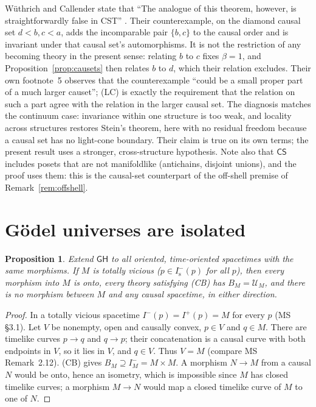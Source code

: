 \documentclass[11pt]{article}
\newtheorem{proposition}[theorem]{Proposition}
\theoremstyle{definition}
\newcommand{\GH}{\mathsf{GH}}
\newcommand{\U}{\mathcal U}
\newcommand{\Ifut}{I^{+}}
\newcommand{\Ichr}{I^{-}}
\begin{document}
Wüthrich and Callender state that ``The analogue of this theorem, however, is
straightforwardly false in CST'' \citep[\S3]{WC2017}. Their counterexample, on
the diamond causal set $d<b,c<a$, adds the incomparable pair $\{b,c\}$ to the
causal order and is invariant under that causal set's automorphisms. It is not
the restriction of any becoming theory in the present sense: relating $b$ to
$c$ fixes $\beta=1$, and Proposition~\ref{prop:causets} then relates $b$ to $d$,
which their relation excludes. Their own footnote~5 observes that the
counterexample ``could be a small proper part of a much larger causet''; (LC) is
exactly the requirement that the relation on such a part agree with the
relation in the larger causal set. The diagnosis matches the continuum case:
invariance within one structure is too weak, and locality across structures
restores Stein's theorem, here with no residual freedom because a causal set
has no light-cone boundary. Their claim is true on its own terms; the present
result uses a stronger, cross-structure hypothesis. Note also that
$\mathsf{CS}$ includes posets that are not manifoldlike (antichains, disjoint
unions), and the proof uses them: this is the causal-set counterpart of the
off-shell premise of Remark~\ref{rem:offshell}.

\section{Gödel universes are isolated}\label{sec:godel}

\begin{proposition}\label{prop:godel}
Extend $\GH$ to all oriented, time-oriented spacetimes with the same
morphisms. If $M$ is totally vicious ($p\in\Ichr_{\mathrm s}(p)$ for all $p$),
then every morphism into $M$ is onto, every theory satisfying (CB) has
$B_M=\U_M$, and there is no morphism between $M$ and any causal spacetime, in
either direction.
\end{proposition}

\begin{proof}
In a totally vicious spacetime $\Ichr(p)=\Ifut(p)=M$ for every $p$ (MS \S3.1).
Let $V$ be nonempty, open and causally convex, $p\in V$ and $q\in M$. There are
timelike curves $p\to q$ and $q\to p$; their concatenation is a causal curve
with both endpoints in $V$, so it lies in $V$, and $q\in V$. Thus $V=M$
(compare MS Remark~2.12). (CB) gives $B_M\supseteq\Ichr_M=M\times M$. A morphism
$N\to M$ from a causal $N$ would be onto, hence an isometry, which is
impossible since $M$ has closed timelike curves; a morphism $M\to N$ would map
a closed timelike curve of $M$ to one of $N$.
\end{proof}
\end{document}
